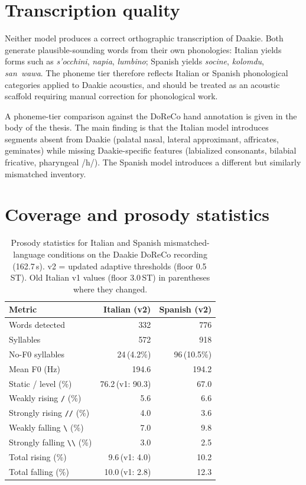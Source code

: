\section*{Transcription quality}

Neither model produces a correct orthographic transcription of Daakie.
Both generate plausible-sounding words from their own phonologies:
Italian yields forms such as \textit{s'occhini}, \textit{napia},
\textit{lumbino}; Spanish yields \textit{socine}, \textit{kolomdu},
\textit{san~wawa}.
The phoneme tier therefore reflects Italian or Spanish phonological categories
applied to Daakie acoustics, and should be treated as an acoustic scaffold
requiring manual correction for phonological work.

A phoneme-tier comparison against the DoReCo hand annotation is given in the body
of the thesis. The main finding is that the Italian model introduces segments absent
from Daakie (palatal nasal, lateral approximant, affricates, geminates) while
missing Daakie-specific features (labialized consonants, bilabial fricative,
pharyngeal /h/). The Spanish model introduces a different but similarly
mismatched inventory.

\section*{Coverage and prosody statistics}

\begin{table}[h]
\centering
\caption{Prosody statistics for Italian and Spanish mismatched-language conditions
on the Daakie DoReCo recording (162.7\,s).
v2 = updated adaptive thresholds (floor 0.5\,ST).
Old Italian v1 values (floor 3.0\,ST) in parentheses where they changed.}
\label{tab:daakie}
\small
\begin{tabular}{lrr}
\toprule
Metric & Italian (v2) & Spanish (v2) \\
\midrule
Words detected                    & 332           & 776 \\
Syllables                         & 572           & 918 \\
No-F0 syllables                   & 24\,(4.2\%)   & 96\,(10.5\%) \\
Mean F0 (Hz)                      & 194.6         & 194.2 \\
Static / level (\%)               & 76.2\,(v1: 90.3) & 67.0 \\
Weakly rising \texttt{/} (\%)     & 5.6           & 6.6 \\
Strongly rising \texttt{//} (\%)  & 4.0           & 3.6 \\
Weakly falling \texttt{\textbackslash} (\%)  & 7.0  & 9.8 \\
Strongly falling \texttt{\textbackslash\textbackslash} (\%) & 3.0 & 2.5 \\
Total rising (\%)                 & 9.6\,(v1: 4.0) & 10.2 \\
Total falling (\%)                & 10.0\,(v1: 2.8) & 12.3 \\
\bottomrule
\end{tabular}
\end{table}

